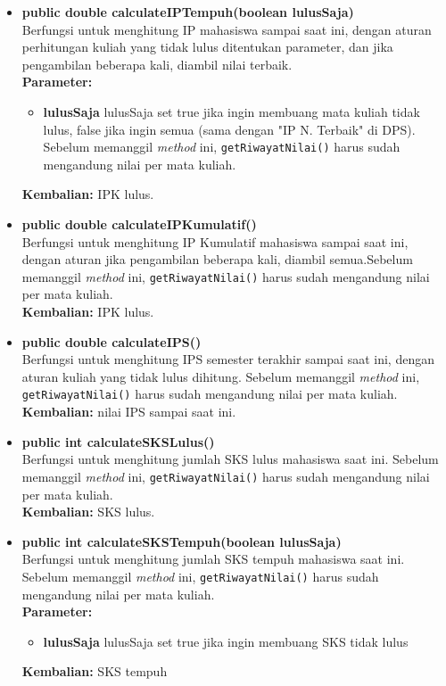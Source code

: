 \begin{itemize}
	\item \textbf{public double calculateIPTempuh(boolean lulusSaja)}\\
	Berfungsi untuk menghitung IP mahasiswa sampai saat ini, dengan aturan perhitungan kuliah yang tidak lulus ditentukan parameter, dan jika pengambilan beberapa kali, diambil nilai terbaik.\\
        \textbf{Parameter:}
		\begin{itemize}
			\item \textbf{lulusSaja} lulusSaja set true jika ingin membuang mata kuliah tidak lulus, false jika ingin semua (sama dengan "IP N. Terbaik" di DPS). Sebelum memanggil \textit{method} ini, \texttt{getRiwayatNilai()} harus sudah mengandung nilai per mata kuliah.
		\end{itemize}
		\textbf{Kembalian:} IPK lulus.
		
	\item \textbf{public double calculateIPKumulatif()}\\
	Berfungsi untuk menghitung IP Kumulatif mahasiswa sampai saat ini, dengan aturan jika pengambilan beberapa kali, diambil semua.Sebelum memanggil \textit{method} ini, \texttt{getRiwayatNilai()} harus sudah mengandung nilai per mata kuliah.\\
		\textbf{Kembalian:} IPK lulus.
		
	\item \textbf{public double calculateIPS()}\\
		Berfungsi untuk menghitung IPS semester terakhir sampai saat ini, dengan aturan kuliah yang tidak lulus dihitung. Sebelum memanggil \textit{method} ini, \texttt{getRiwayatNilai()} harus sudah mengandung nilai per mata kuliah.\\
		\textbf{Kembalian:}  nilai IPS sampai saat ini.
		
	\item \textbf{public int calculateSKSLulus()}\\
		Berfungsi untuk menghitung jumlah SKS lulus mahasiswa saat ini. Sebelum memanggil \textit{method} ini, \texttt{getRiwayatNilai()} harus sudah mengandung nilai per mata kuliah.\\
		\textbf{Kembalian:} SKS lulus.
		
	\item \textbf{public int calculateSKSTempuh(boolean lulusSaja)}\\
		Berfungsi untuk menghitung jumlah SKS tempuh mahasiswa saat ini. Sebelum memanggil \textit{method} ini, \texttt{getRiwayatNilai()} harus sudah mengandung nilai per mata kuliah.\\
        \textbf{Parameter:}
		\begin{itemize}
			\item \textbf{lulusSaja} lulusSaja set true jika ingin membuang SKS tidak lulus
		\end{itemize}
		\textbf{Kembalian:} SKS tempuh
		

\end{itemize}
